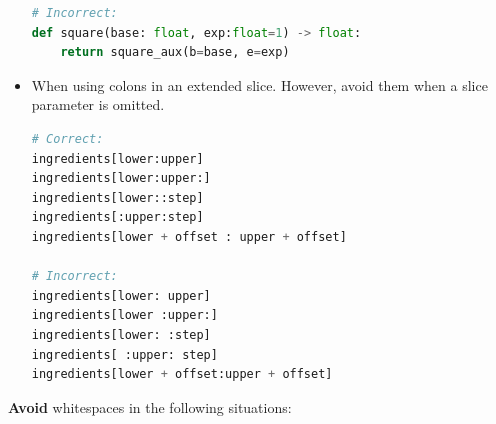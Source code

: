\documentclass{tufte-handout}
\begin{document}
\begin{itemize}
\begin{lstlisting}[numbers=none,language=python]
# Incorrect:
def square(base: float, exp:float=1) -> float:
    return square_aux(b=base, e=exp)
\end{lstlisting}

	\item When using colons in an extended slice. However, avoid them when a slice parameter is omitted.
	
\begin{lstlisting}[numbers=none,language=python]
# Correct:
ingredients[lower:upper]
ingredients[lower:upper:]
ingredients[lower::step]
ingredients[:upper:step]
ingredients[lower + offset : upper + offset]

# Incorrect:
ingredients[lower: upper]
ingredients[lower :upper:]
ingredients[lower: :step]
ingredients[ :upper: step]
ingredients[lower + offset:upper + offset]
\end{lstlisting}
	
\end{itemize}
\textbf{Avoid} whitespaces in the following situations:
\end{document}
